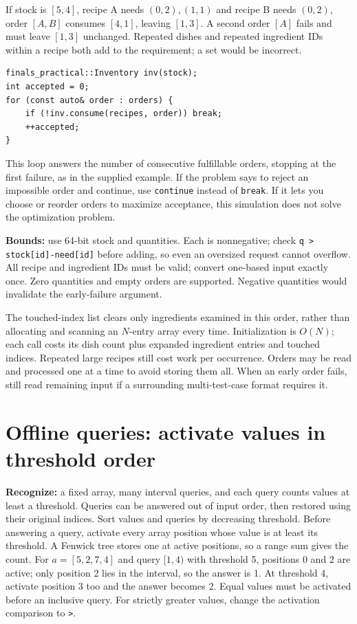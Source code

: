 If stock is $[5,4]$, recipe A needs $(0,2),(1,1)$ and recipe B needs $(0,2)$,
order $[A,B]$ consumes $[4,1]$, leaving $[1,3]$. A second order $[A]$ fails
and must leave $[1,3]$ unchanged. Repeated dishes and repeated ingredient IDs
within a recipe both add to the requirement; a set would be incorrect.
\begin{lstlisting}
finals_practical::Inventory inv(stock);
int accepted = 0;
for (const auto& order : orders) {
    if (!inv.consume(recipes, order)) break;
    ++accepted;
}
\end{lstlisting}
This loop answers the number of consecutive fulfillable orders, stopping at
the first failure, as in the supplied example. If the problem says to reject
an impossible order and continue, use \texttt{continue} instead of
\texttt{break}. If it lets you choose or reorder orders to maximize acceptance,
this simulation does not solve the optimization problem.

\textbf{Bounds:} use 64-bit stock and quantities. Each is nonnegative;
check \texttt{q > stock[id]-need[id]} before adding, so even an oversized
request cannot overflow. All recipe and ingredient IDs must be valid; convert
one-based input exactly once. Zero quantities and empty orders are supported.
Negative quantities would invalidate the early-failure argument.

The touched-index list clears only ingredients examined in this order, rather
than allocating and scanning an $N$-entry array every time. Initialization is
$O(N)$; each call costs its dish count plus expanded ingredient entries and
touched indices. Repeated large recipes still cost work per occurrence.
Orders may be read and processed one at a time to avoid storing them all.
When an early order fails, still read remaining input if a surrounding
multi-test-case format requires it.

\section{Offline queries: activate values in threshold order}
\textbf{Recognize:} a fixed array, many interval queries, and each query
counts values at least a threshold. Queries can be answered out of input
order, then restored using their original indices. Sort values and queries
by decreasing threshold. Before answering a query, activate every array
position whose value is at least its threshold. A Fenwick tree stores one
at active positions, so a range sum gives the count.
For $a=[5,2,7,4]$ and query $[1,4)$ with threshold 5, positions 0 and 2
are active; only position 2 lies in the interval, so the answer is 1.
At threshold 4, activate position 3 too and the answer becomes 2.
Equal values must be activated before an inclusive query. For strictly
greater values, change the activation comparison to \texttt{>}.


